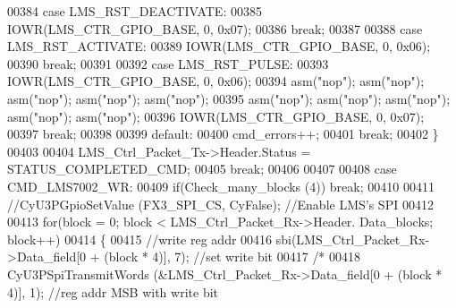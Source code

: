 \begin{DoxyCode}
00384                         \textcolor{keywordflow}{case} LMS_RST_DEACTIVATE:
00385                             IOWR(LMS_CTR_GPIO_BASE, 0, 0x07);
00386                         \textcolor{keywordflow}{break};
00387 
00388                         \textcolor{keywordflow}{case} LMS_RST_ACTIVATE:
00389                             IOWR(LMS_CTR_GPIO_BASE, 0, 0x06);
00390                         \textcolor{keywordflow}{break};
00391 
00392                         \textcolor{keywordflow}{case} LMS_RST_PULSE:
00393                             IOWR(LMS_CTR_GPIO_BASE, 0, 0x06);
00394                             \textcolor{keyword}{asm}(\textcolor{stringliteral}{"nop"}); \textcolor{keyword}{asm}(\textcolor{stringliteral}{"nop"}); \textcolor{keyword}{asm}(\textcolor{stringliteral}{"nop"}); \textcolor{keyword}{asm}(\textcolor{stringliteral}{"nop"}); \textcolor{keyword}{asm}(\textcolor{stringliteral}{"nop"});
00395                             \textcolor{keyword}{asm}(\textcolor{stringliteral}{"nop"}); \textcolor{keyword}{asm}(\textcolor{stringliteral}{"nop"}); \textcolor{keyword}{asm}(\textcolor{stringliteral}{"nop"}); \textcolor{keyword}{asm}(\textcolor{stringliteral}{"nop"}); \textcolor{keyword}{asm}(\textcolor{stringliteral}{"nop"});
00396                             IOWR(LMS_CTR_GPIO_BASE, 0, 0x07);
00397                         \textcolor{keywordflow}{break};
00398 
00399                         \textcolor{keywordflow}{default}:
00400                             cmd_errors++;
00401                         \textcolor{keywordflow}{break};
00402                     \}
00403 
00404                     LMS\_Ctrl\_Packet\_Tx->Header.Status = STATUS_COMPLETED_CMD;
00405                 \textcolor{keywordflow}{break};
00406 
00407 
00408                 \textcolor{keywordflow}{case} CMD_LMS7002_WR:
00409                     \textcolor{keywordflow}{if}(Check_many_blocks (4)) \textcolor{keywordflow}{break};
00410 
00411                     \textcolor{comment}{//CyU3PGpioSetValue (FX3\_SPI\_CS, CyFalse); //Enable LMS's SPI}
00412 
00413                     \textcolor{keywordflow}{for}(block = 0; block < LMS\_Ctrl\_Packet\_Rx->Header.
      Data_blocks; block++)
00414                     \{
00415                         \textcolor{comment}{//write reg addr}
00416                         sbi(LMS\_Ctrl\_Packet\_Rx->Data_field[0 + (block * 4)], 7); \textcolor{comment}{//set write bit}
00417                         \textcolor{comment}{/*}
00418 \textcolor{comment}{                        CyU3PSpiTransmitWords (&LMS\_Ctrl\_Packet\_Rx->Data\_field[0 + (block * 4)], 1); //reg
       addr MSB with write bit}

\end{DoxyCode}
